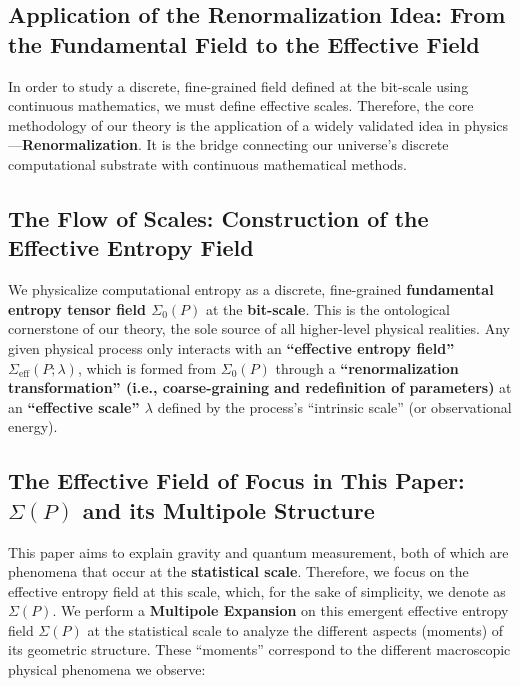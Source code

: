 \documentclass[11pt]{article}
\begin{document}
\subsection{Application of the Renormalization Idea: From the Fundamental Field to the Effective Field}
In order to study a discrete, fine-grained field defined at the bit-scale using continuous mathematics, we must define effective scales. Therefore, the core methodology of our theory is the application of a widely validated idea in physics—\textbf{Renormalization}. It is the bridge connecting our universe's discrete computational substrate with continuous mathematical methods.

\subsection{The Flow of Scales: Construction of the Effective Entropy Field}
We physicalize computational entropy as a discrete, fine-grained \textbf{fundamental entropy tensor field $\Sigma_0(P)$} at the \textbf{bit-scale}. This is the ontological cornerstone of our theory, the sole source of all higher-level physical realities. Any given physical process only interacts with an \textbf{``effective entropy field'' $\Sigma_{\text{eff}}(P; \lambda)$}, which is formed from $\Sigma_0(P)$ through a \textbf{``renormalization transformation'' (i.e., coarse-graining and redefinition of parameters)} at an \textbf{``effective scale'' $\lambda$} defined by the process's ``intrinsic scale'' (or observational energy).

\subsection{The Effective Field of Focus in This Paper: $\Sigma(P)$ and its Multipole Structure}
This paper aims to explain gravity and quantum measurement, both of which are phenomena that occur at the \textbf{statistical scale}. Therefore, we focus on the effective entropy field at this scale, which, for the sake of simplicity, we denote as $\Sigma(P)$. We perform a \textbf{Multipole Expansion} on this emergent effective entropy field $\Sigma(P)$ at the statistical scale to analyze the different aspects (moments) of its geometric structure. These ``moments'' correspond to the different macroscopic physical phenomena we observe:
\end{document}
